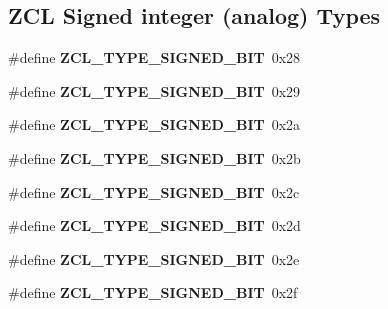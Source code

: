 \subsection*{Z\-C\-L Signed integer (analog) Types}
\begin{DoxyCompactItemize}
\item 
\hypertarget{group__zcl__types_ga8df1144075b3c768717e38f750ff4d2d}{\#define {\bfseries Z\-C\-L\-\_\-\-T\-Y\-P\-E\-\_\-\-S\-I\-G\-N\-E\-D\-\_\-B\-I\-T}~0x28}\label{group__zcl__types_ga8df1144075b3c768717e38f750ff4d2d}

\item 
\hypertarget{group__zcl__types_ga8ee8ec849fb738d70b81ce4b4af8ea93}{\#define {\bfseries Z\-C\-L\-\_\-\-T\-Y\-P\-E\-\_\-\-S\-I\-G\-N\-E\-D\-\_\-B\-I\-T}~0x29}\label{group__zcl__types_ga8ee8ec849fb738d70b81ce4b4af8ea93}

\item 
\hypertarget{group__zcl__types_ga5d2c6473dec5ef0620e49a064e1b5040}{\#define {\bfseries Z\-C\-L\-\_\-\-T\-Y\-P\-E\-\_\-\-S\-I\-G\-N\-E\-D\-\_\-B\-I\-T}~0x2a}\label{group__zcl__types_ga5d2c6473dec5ef0620e49a064e1b5040}

\item 
\hypertarget{group__zcl__types_gadb5ed867f966c7d280a59abd421004a9}{\#define {\bfseries Z\-C\-L\-\_\-\-T\-Y\-P\-E\-\_\-\-S\-I\-G\-N\-E\-D\-\_\-B\-I\-T}~0x2b}\label{group__zcl__types_gadb5ed867f966c7d280a59abd421004a9}

\item 
\hypertarget{group__zcl__types_ga194ccd242604887fbaa41cd427088643}{\#define {\bfseries Z\-C\-L\-\_\-\-T\-Y\-P\-E\-\_\-\-S\-I\-G\-N\-E\-D\-\_\-B\-I\-T}~0x2c}\label{group__zcl__types_ga194ccd242604887fbaa41cd427088643}

\item 
\hypertarget{group__zcl__types_gad6d48bb79a8dc729807f137924d26920}{\#define {\bfseries Z\-C\-L\-\_\-\-T\-Y\-P\-E\-\_\-\-S\-I\-G\-N\-E\-D\-\_\-B\-I\-T}~0x2d}\label{group__zcl__types_gad6d48bb79a8dc729807f137924d26920}

\item 
\hypertarget{group__zcl__types_ga56a4716c3e4b5e8fd3b9bc4d944c5533}{\#define {\bfseries Z\-C\-L\-\_\-\-T\-Y\-P\-E\-\_\-\-S\-I\-G\-N\-E\-D\-\_\-B\-I\-T}~0x2e}\label{group__zcl__types_ga56a4716c3e4b5e8fd3b9bc4d944c5533}

\item 
\hypertarget{group__zcl__types_ga05040382bcbb409fdc93d7130057e3c6}{\#define {\bfseries Z\-C\-L\-\_\-\-T\-Y\-P\-E\-\_\-\-S\-I\-G\-N\-E\-D\-\_\-B\-I\-T}~0x2f}\label{group__zcl__types_ga05040382bcbb409fdc93d7130057e3c6}

\end{DoxyCompactItemize}
